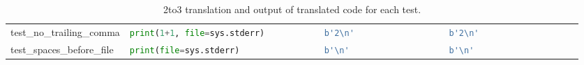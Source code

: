\begin{table}[ht]
\begin{tabular}{@{}l|llll@{}}
    test\_no\_trailing\_comma             & \lstinline[language=Python, style=pythonstyle]|print(1+1, file=sys.stderr)          | & \lstinline[language=Python, style=pythonstyle]|b'2\n'                 | & \lstinline[language=Python, style=pythonstyle]|b'2\n'                 | \\ 
    test\_spaces\_before\_file            & \lstinline[language=Python, style=pythonstyle]|print(file=sys.stderr)               | & \lstinline[language=Python, style=pythonstyle]|b'\n'                  | & \lstinline[language=Python, style=pythonstyle]|b'\n'                  | \\ \bottomrule
    \end{tabular}
    \caption{2to3 translation and output of translated code for each test.}
\end{table}

